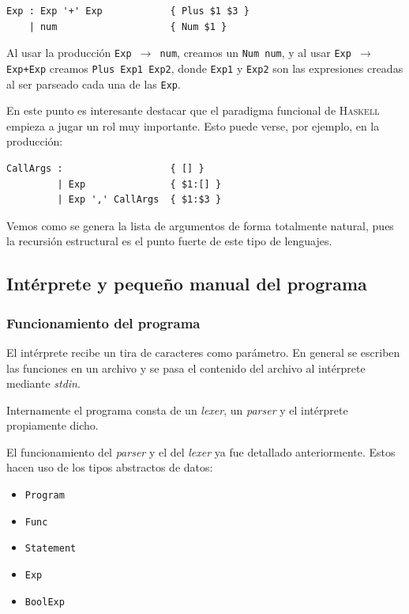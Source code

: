 \begin{verbatim}
Exp : Exp '+' Exp            { Plus $1 $3 }
    | num                    { Num $1 }
\end{verbatim}

Al usar la producci\'on \texttt{Exp ${\rightarrow}$ num}, creamos un 
\texttt{Num num}, y al usar \texttt{Exp ${\rightarrow}$ Exp+Exp} creamos
\texttt{Plus Exp1 Exp2}, donde \texttt{Exp1} y \texttt{Exp2} son las expresiones creadas
al ser parseado cada una de las \texttt{Exp}.

En este punto es interesante destacar que el paradigma funcional de \textsc{Haskell}
empieza a jugar un rol muy importante. Esto puede verse, por ejemplo, en la producci\'on:
\begin{verbatim}
CallArgs :                   { [] }
         | Exp               { $1:[] }
         | Exp ',' CallArgs  { $1:$3 }
\end{verbatim}

Vemos como se genera la lista de argumentos de forma totalmente natural, pues la recursi\'on
estructural es el punto fuerte de este tipo de lenguajes.


\subsection{Int\'erprete y peque\~no manual del programa}

\subsubsection{Funcionamiento del programa}

El int\'erprete recibe un tira de caracteres como par\'ametro.
En general se escriben las funciones en un archivo y se pasa el contenido del
archivo al int\'erprete mediante \textit{stdin}.

Internamente el programa consta de un \textit{lexer}, un \textit{parser} y el
int\'erprete propiamente dicho.

El funcionamiento del \textit{parser} y el del \textit{lexer} ya fue detallado
anteriormente. Estos hacen uso de los tipos abstractos de datos:
\begin{itemize}
    \item \texttt{Program}
    \item \texttt{Func}
    \item \texttt{Statement}
    \item \texttt{Exp}
    \item \texttt{BoolExp}
\end{itemize}

